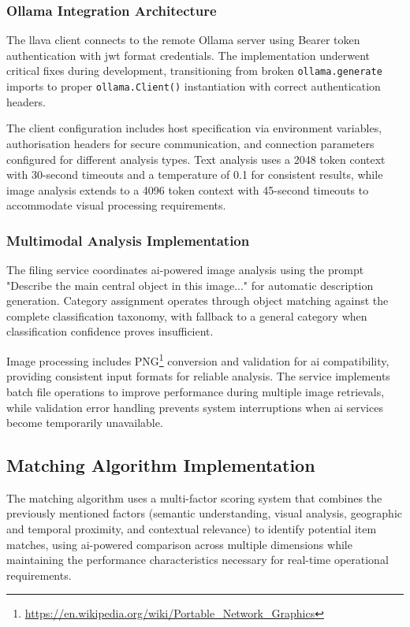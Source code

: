 \subsubsection{Ollama Integration Architecture}

The \ac{llava} client connects to the remote Ollama server using Bearer token authentication with \ac{jwt} format credentials. The implementation underwent critical fixes during development, transitioning from broken \texttt{ollama.generate} imports to proper \texttt{ollama.Client()} instantiation with correct authentication headers.


The client configuration includes host specification via environment variables, authorisation headers for secure communication, and connection parameters configured for different analysis types. Text analysis uses a 2048 token context with 30-second timeouts and a temperature of 0.1 for consistent results, while image analysis extends to a 4096 token context with 45-second timeouts to accommodate visual processing requirements.

\subsubsection{Multimodal Analysis Implementation}

The filing service coordinates \ac{ai}-powered image analysis using the prompt "Describe the main central object in this image..." for automatic description generation. Category assignment operates through object matching against the complete classification taxonomy, with fallback to a general category when classification confidence proves insufficient.

Image processing includes PNG\footnote{\url{https://en.wikipedia.org/wiki/Portable_Network_Graphics}} conversion and validation for \ac{ai} compatibility, providing consistent input formats for reliable analysis. The service implements batch file operations to improve performance during multiple image retrievals, while validation error handling prevents system interruptions when \ac{ai} services become temporarily unavailable.

\subsection{Matching Algorithm Implementation} \label{subsection:matching_algorithm}

The matching algorithm uses a multi-factor scoring system that combines the previously mentioned factors (semantic understanding, visual analysis, geographic and temporal proximity, and contextual relevance) to identify potential item matches, using \ac{ai}-powered comparison across multiple dimensions while maintaining the performance characteristics necessary for real-time operational requirements.

